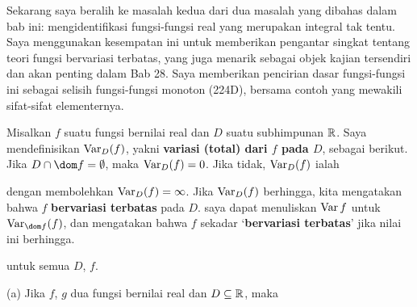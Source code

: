 
\def\chaptername{Teorema Dasar Kalkulus}
\def\sectionname{Fungsi bervariasi terbatas}


Sekarang saya beralih ke masalah kedua dari dua masalah yang dibahas dalam
bab ini: mengidentifikasi fungsi-fungsi real yang merupakan integral tak
tentu. Saya menggunakan kesempatan ini untuk memberikan pengantar singkat
tentang teori fungsi bervariasi terbatas, yang juga menarik sebagai objek kajian tersendiri
dan akan penting dalam Bab 28. Saya memberikan pencirian dasar fungsi-fungsi
ini sebagai selisih fungsi-fungsi monoton (224D), bersama contoh yang
mewakili sifat-sifat elementernya.

 Misalkan $f$ suatu fungsi bernilai real dan $D$
suatu subhimpunan $\Bbb R$. Saya mendefinisikan $\mathop{\text{Var}}_D(f)$, yakni
{\bf variasi (total) dari $f$ pada $D$}, sebagai berikut. Jika
$D\cap\dom f=\emptyset$, maka $\mathop{\text{Var}}_D(f)=0$. Jika tidak, $\mathop{\text{Var}}_D(f)$ ialah


\noindent dengan membolehkan $\mathop{\text{Var}}_{D}(f)=\infty$.
Jika $\mathop{\text{Var}}_{D}(f)$ berhingga, kita mengatakan bahwa $f$ {\bf bervariasi
terbatas} pada $D$.  saya dapat
menuliskan $\mathop{\text{Var}} f$ untuk $\Var_{\dom f}(f)$, dan mengatakan bahwa $f$
sekadar `{\bf bervariasi terbatas}' jika nilai ini berhingga.



\noindent untuk semua $D$, $f$.

 (a) Jika $f$, $g$ dua fungsi bernilai real dan
$D\subseteq\Bbb R$, maka


